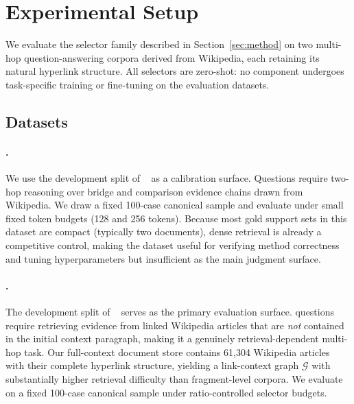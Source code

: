 \section{Experimental Setup}
\label{sec:setup}

We evaluate the selector family described in Section~\ref{sec:method} on two
multi-hop question-answering corpora derived from Wikipedia, each retaining
its natural hyperlink structure.
All selectors are zero-shot: no component undergoes task-specific training or
fine-tuning on the evaluation datasets.

\subsection{Datasets}
\label{sec:setup:datasets}

\paragraph{\TwoWiki.}
We use the development split of \TwoWiki~\cite{ho2020twowikimultihopqa}
as a calibration surface.
Questions require two-hop reasoning over bridge and comparison evidence
chains drawn from Wikipedia.
We draw a fixed 100-case canonical sample and evaluate under small fixed
token budgets (128 and 256 tokens).
Because most gold support sets in this dataset are compact (typically two
documents), dense retrieval is already a competitive control, making the
dataset useful for verifying method correctness and tuning hyperparameters
but insufficient as the main judgment surface.

\paragraph{\IIRC.}
The development split of \IIRC~\cite{ferguson2020iirc} serves as the primary
evaluation surface.
\IIRC questions require retrieving evidence from linked Wikipedia articles that
are \emph{not} contained in the initial context paragraph, making it a
genuinely retrieval-dependent multi-hop task.
Our full-context document store contains 61{,}304 Wikipedia articles with
their complete hyperlink structure, yielding a link-context graph
$\mathcal{G}$ with substantially higher retrieval difficulty than fragment-level
corpora.
We evaluate on a fixed 100-case canonical sample under ratio-controlled
selector budgets.

